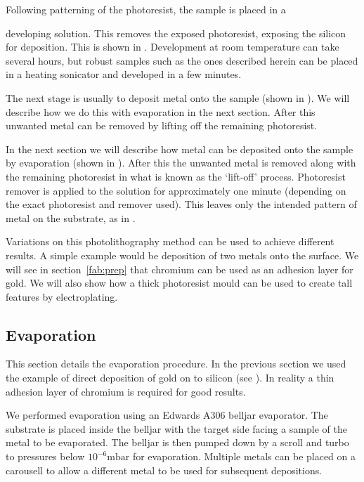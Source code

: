 Following patterning of the photoresist, the sample is placed in a {developing
solution. This removes the exposed photoresist, exposing the silicon for
deposition. This is shown in . Development at
room temperature can take several hours, but robust samples such as the ones
described herein can be placed in a heating sonicator and developed in a few
minutes.

The next stage is usually to deposit metal onto the sample (shown in
). We will describe how we do this with
evaporation in the next section. After this unwanted metal can be removed by
lifting off the remaining photoresist. 

In the next section we will describe how metal can be deposited onto the sample
by evaporation (shown in ). After this the
unwanted metal is removed along with the remaining photoresist in what is known
as the `lift-off' process. Photoresist remover is applied to the solution for
approximately one minute (depending on the exact photoresist and remover used).
This leaves only the intended pattern of metal on the substrate, as in
.

Variations on this photolithography method can be used to achieve different
results. A simple example would be deposition of two metals onto the surface.
We will see in section~\ref{fab:prep} that chromium can be used as an
adhesion layer for gold. We will also show how a thick photoresist mould can be
used to create tall features by electroplating.

\subsection{Evaporation}
\label{fab:evap}

This section details the evaporation procedure. In the previous section we used
the example of direct deposition of gold on to silicon (see
). In reality a thin adhesion layer of chromium
is required for good results.~\cite{Madou2002}

We performed evaporation using an Edwards A306 belljar evaporator.  The
substrate is placed inside the belljar with the target side facing a sample of
the metal to be evaporated. The belljar is then pumped down by a scroll and
turbo to pressures below $10^{-6}\si{\milli\bar}$ for evaporation. Multiple
metals can be placed on a carousell to allow a different metal to be used for
subsequent depositions.

}
